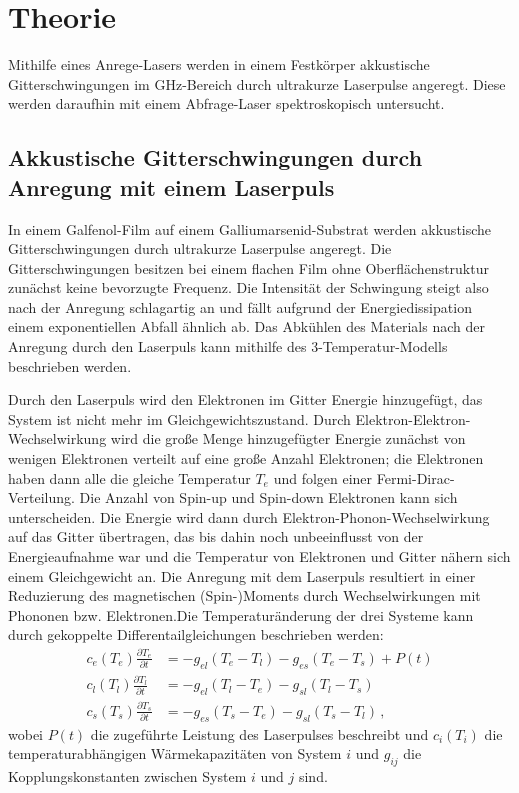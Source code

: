 \section{Theorie}

Mithilfe eines Anrege-Lasers werden in einem Festkörper akkustische Gitterschwingungen im GHz-Bereich durch ultrakurze Laserpulse angeregt. Diese werden daraufhin mit einem Abfrage-Laser spektroskopisch untersucht.

\subsection{Akkustische Gitterschwingungen durch Anregung mit einem Laserpuls}

In einem Galfenol-Film auf einem Galliumarsenid-Substrat werden akkustische Gitterschwingungen durch ultrakurze Laserpulse angeregt. Die Gitterschwingungen besitzen bei einem flachen Film ohne Oberflächenstruktur zunächst keine bevorzugte Frequenz. Die Intensität der Schwingung steigt also nach der Anregung schlagartig an und fällt aufgrund der Energiedissipation einem exponentiellen Abfall ähnlich ab. Das Abkühlen des Materials nach der Anregung durch den Laserpuls kann mithilfe des 3-Temperatur-Modells beschrieben werden.\par

Durch den Laserpuls wird den Elektronen im Gitter Energie hinzugefügt, das System ist nicht mehr im Gleichgewichtszustand. Durch Elektron-Elektron-Wechselwirkung wird die große Menge hinzugefügter Energie zunächst von wenigen Elektronen verteilt auf eine große Anzahl Elektronen; die Elektronen haben dann alle die gleiche Temperatur $T_e$ und folgen einer Fermi-Dirac-Verteilung. Die Anzahl von Spin-up und Spin-down Elektronen kann sich unterscheiden. Die Energie wird dann durch Elektron-Phonon-Wechselwirkung auf das Gitter übertragen, das bis dahin noch unbeeinflusst von der Energieaufnahme war und die Temperatur von Elektronen und Gitter nähern sich einem Gleichgewicht an. Die Anregung mit dem Laserpuls resultiert in einer Reduzierung des magnetischen (Spin-)Moments durch Wechselwirkungen mit Phononen bzw. Elektronen.Die Temperaturänderung der drei Systeme kann durch gekoppelte Differentailgleichungen beschrieben werden:
\begin{align}
  c_e(T_e)\frac{\partial T_e}{\partial t} &= -g_{el} (T_e - T_l) - g_{es}(T_e - T_s) + P(t)\\
  c_l(T_l)\frac{\partial T_l}{\partial t} &= -g_{el} (T_l - T_e) - g_{sl}(T_l - T_s)\\
  c_s(T_s)\frac{\partial T_s}{\partial t} &= -g_{es} (T_s - T_e) - g_{sl}(T_s - T_l)\,,
\end{align}
wobei $P(t)$ die zugeführte Leistung des Laserpulses beschreibt und $c_i(T_i)$ die temperaturabhängigen Wärmekapazitäten von System $i$ und $g_{ij}$ die Kopplungskonstanten zwischen System $i$ und $j$ sind.\par


